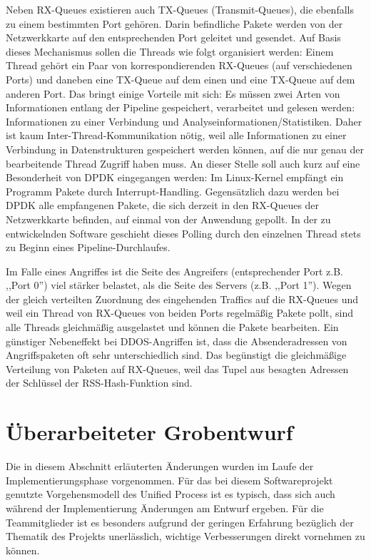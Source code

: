 \documentclass[../review_2.tex]{subfiles}
\begin{document}
Neben RX-Queues existieren auch TX-Queues (Transmit-Queues), die ebenfalls zu einem bestimmten Port gehören. Darin befindliche Pakete werden von der Netzwerkkarte auf den entsprechenden Port geleitet und gesendet. Auf Basis dieses Mechanismus sollen die Threads wie folgt organisiert werden: Einem Thread gehört ein Paar von korrespondierenden RX-Queues (auf verschiedenen Ports) und daneben eine TX-Queue auf dem einen und eine TX-Queue auf dem anderen Port. Das bringt einige Vorteile mit sich: Es müssen zwei Arten von Informationen entlang der Pipeline gespeichert, verarbeitet und gelesen werden: Informationen zu einer Verbindung und Analyseinformationen/Statistiken. Daher ist kaum Inter-Thread-Kommunikation nötig, weil alle Informationen zu einer Verbindung in Datenstrukturen gespeichert werden können, auf die nur genau der bearbeitende Thread Zugriff haben muss. An dieser Stelle soll auch kurz auf eine Besonderheit von DPDK eingegangen werden: Im Linux-Kernel empfängt ein Programm Pakete durch Interrupt-Handling. Gegensätzlich dazu werden bei DPDK alle empfangenen Pakete, die sich derzeit in den RX-Queues der Netzwerkkarte befinden, auf einmal von der Anwendung gepollt. In der zu entwickelnden Software geschieht dieses Polling durch den einzelnen Thread stets zu Beginn eines Pipeline-Durchlaufes.

Im Falle eines Angriffes ist die Seite des Angreifers (entsprechender Port z.B. ,,Port 0'') viel stärker belastet, als die Seite des Servers (z.B. ,,Port 1''). Wegen der gleich verteilten Zuordnung des eingehenden Traffics auf die RX-Queues und weil ein Thread von RX-Queues von beiden Ports regelmäßig Pakete pollt, sind alle Threads gleichmäßig ausgelastet und können die Pakete bearbeiten. Ein günstiger Nebeneffekt bei DDOS-Angriffen ist, dass die Absenderadressen von Angriffspaketen oft sehr unterschiedlich sind. Das begünstigt die gleichmäßige Verteilung von Paketen auf RX-Queues, weil das Tupel aus besagten Adressen der Schlüssel der RSS-Hash-Funktion sind.

\section{Überarbeiteter Grobentwurf}

Die in diesem Abschnitt erläuterten Änderungen wurden im Laufe der Implementierungsphase vorgenommen. Für das bei diesem Softwareprojekt genutzte Vorgehensmodell des Unified Process ist es typisch, dass sich auch während der Implementierung Änderungen am Entwurf ergeben. Für die Teammitglieder ist es besonders aufgrund der geringen Erfahrung bezüglich der Thematik des Projekts unerlässlich, wichtige Verbesserungen direkt vornehmen zu können.
\end{document}
